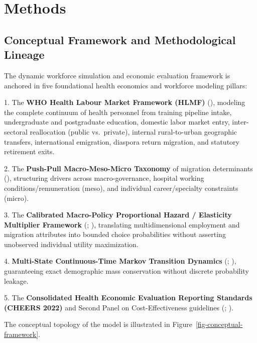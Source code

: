 \documentclass[
  11pt,
  a4paper]{article}
\begin{document}
\section{Methods}\label{sec-methods}

\subsection{Conceptual Framework and Methodological
Lineage}\label{sec-methods-framework}

The dynamic workforce simulation and economic evaluation framework is
anchored in five foundational health economics and workforce modeling
pillars:

1. The \textbf{WHO Health Labour Market Framework (HLMF)}
(), modeling the
complete continuum of health personnel from training pipeline intake,
undergraduate and postgraduate education, domestic labor market entry,
inter-sectoral reallocation (public vs.~private), internal
rural-to-urban geographic transfers, international emigration, diaspora
return migration, and statutory retirement exits.

2. The \textbf{Push-Pull Macro-Meso-Micro Taxonomy} of migration
determinants (), structuring
drivers across macro-governance, hospital working
conditions/remuneration (meso), and individual career/specialty
constraints (micro).

3. The \textbf{Calibrated Macro-Policy Proportional Hazard / Elasticity
Multiplier Framework} (; ),
translating multidimensional employment and migration attributes into
bounded choice probabilities without asserting unobserved individual
utility maximization.

4. \textbf{Multi-State Continuous-Time Markov Transition Dynamics}
(;
), guaranteeing exact
demographic mass conservation without discrete probability leakage.

5. The \textbf{Consolidated Health Economic Evaluation Reporting
Standards (CHEERS 2022)} and Second Panel on Cost-Effectiveness
guidelines (;
).

The conceptual topology of the model is illustrated in
Figure~\ref{fig-conceptual-framework}.
\end{document}
